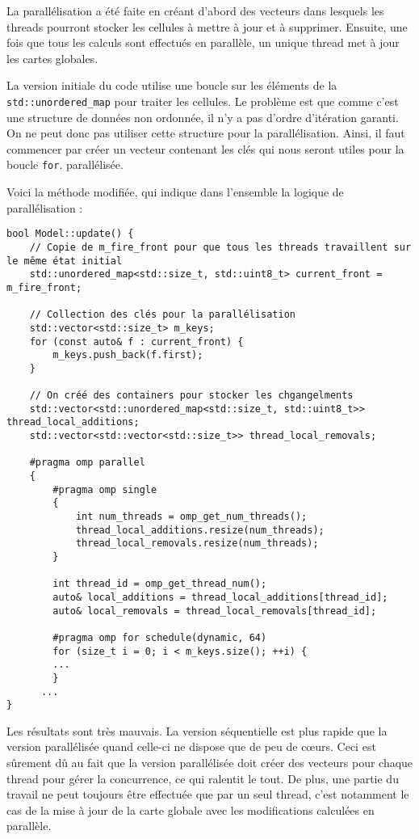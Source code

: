 \documentclass[a4paper, 12pt]{report}
\begin{document}
La parallélisation a été faite en créant d'abord des vecteurs dans lesquels les threads pourront stocker les cellules à mettre à jour et à supprimer. Ensuite, une fois que tous les calculs sont effectués en parallèle, un unique thread met à jour les cartes globales.

La version initiale du code utilise une boucle sur les éléments de la \texttt{std::unordered_map} pour traiter les cellules. Le problème est que comme c'est une structure de données non ordonnée, il n'y a pas d'ordre d'itération garanti. On ne peut donc pas utiliser cette structure pour la parallélisation. Ainsi, il faut commencer par créer un vecteur contenant les clés qui nous seront utiles pour la boucle \texttt{for}. parallélisée.

Voici la méthode modifiée, qui indique dans l'ensemble la logique de parallélisation :

\begin{verbatim}
bool Model::update() {
    // Copie de m_fire_front pour que tous les threads travaillent sur le même état initial
    std::unordered_map<std::size_t, std::uint8_t> current_front = m_fire_front;

    // Collection des clés pour la parallélisation
    std::vector<std::size_t> m_keys;
    for (const auto& f : current_front) {
        m_keys.push_back(f.first);
    }

    // On créé des containers pour stocker les chgangelments
    std::vector<std::unordered_map<std::size_t, std::uint8_t>> thread_local_additions;
    std::vector<std::vector<std::size_t>> thread_local_removals;

    #pragma omp parallel
    {
        #pragma omp single
        {
            int num_threads = omp_get_num_threads();
            thread_local_additions.resize(num_threads);
            thread_local_removals.resize(num_threads);
        }

        int thread_id = omp_get_thread_num();
        auto& local_additions = thread_local_additions[thread_id];
        auto& local_removals = thread_local_removals[thread_id];

        #pragma omp for schedule(dynamic, 64)
        for (size_t i = 0; i < m_keys.size(); ++i) {
        ...
        }
      ...
}
\end{verbatim}

Les résultats sont très mauvais. La version séquentielle est plus rapide que la version parallélisée quand celle-ci ne dispose que de peu de cœurs. Ceci est sûrement dû au fait que la version parallélisée doit créer des vecteurs pour chaque thread pour gérer la concurrence, ce qui ralentit le tout. De plus, une partie du travail ne peut toujours être effectuée que par un seul thread, c'est notamment le cas de la mise à jour de la carte globale avec les modifications calculées en parallèle.
\end{document}

